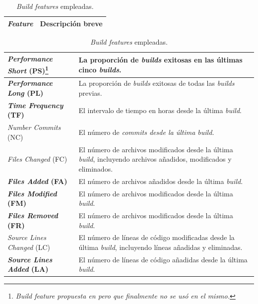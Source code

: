\begin{table}[h]
    \centering
    \caption{\textit{Build features} empleadas.}
    \label{tab:features}

    \begin{tabular}{|>{\centering\arraybackslash}m{4cm}|>{\centering\arraybackslash}m{8cm}|} %
        \hline
        \textbf{\textit{Feature}} & \textbf{Descripción breve} \\
        \hline
    \end{tabular}
    \begin{tabular}{|>{\raggedright\arraybackslash}m{4cm}|>{\raggedright\arraybackslash}m{8cm}|} %
        \hline
        \textbf{\textit{Performance Short} (PS)\footnote{\textit{Build feature propuesta en \cite{2} pero que finalmente no se usó en el mismo.}}} & La proporción de \textit{builds} exitosas en las últimas cinco \textit{builds}.\\
        \hline
        \textbf{\textit{Performance Long} (PL)\footnotemark[1]} & La proporción de \textit{builds} exitosas de todas las \textit{builds} previas.\\
        \hline
        \textbf{\textit{Time Frequency} (TF)\footnotemark[1]} & El intervalo de tiempo en horas desde la última \textit{build}.\\
        \hline
        \textit{Number Commits} (NC) & El número de \textit{commits desde la última \textit{build}.}\\
        \hline
        \textit{Files Changed} (FC) & El número de archivos modificados desde la última \textit{build}, incluyendo archivos añadidos, modificados y eliminados.\\
        \hline
        \textbf{\textit{Files Added} (FA)} & El número de archivos añadidos desde la última \textit{build}.\\
        \hline
        \textbf{\textit{Files Modified} (FM)} & El número de archivos modificados desde la última \textit{build}.\\
        \hline
        \textbf{\textit{Files Removed} (FR)} & El número de archivos modificados desde la última \textit{build}.\\
        \hline
        \textit{Source Lines Changed} (LC) & El número de líneas de código modificadas desde la última \textit{build}, incluyendo líneas añadidas y eliminadas.\\
        \hline
        \textbf{\textit{Source Lines Added} (LA)} & El número de líneas de código añadidas desde la última \textit{build}.\\

\end{tabular}
\end{table}

